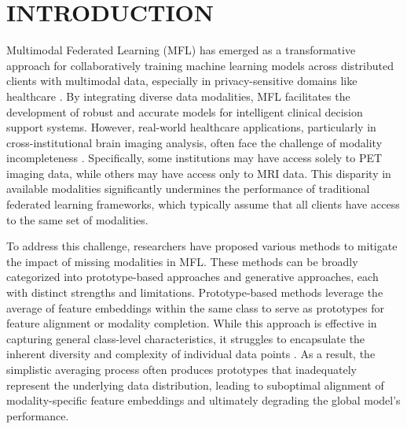 \section{INTRODUCTION}
Multimodal Federated Learning (MFL) has emerged as a transformative approach for collaboratively training machine learning models across distributed clients with multimodal data, especially in privacy-sensitive domains like healthcare \cite{MLF_healthcare_review,MFL_a_survey,survey_of_MFL}. By integrating diverse data modalities, MFL facilitates the development of robust and accurate models for intelligent clinical decision support systems. However, real-world healthcare applications, particularly in cross-institutional brain imaging analysis, often face the challenge of modality incompleteness \cite{FedMI}. Specifically, some institutions  may have access solely to PET imaging data, while others may have access only to MRI data. This disparity in available modalities significantly undermines the performance of traditional federated learning frameworks, which typically assume that all clients have access to the same set of modalities.

To address this challenge, researchers have proposed various methods to mitigate the impact of missing modalities in MFL. These methods can be broadly categorized into prototype-based approaches and generative approaches, each with distinct strengths and limitations. Prototype-based methods \cite{FedMI,MFCPL,PmcmFL} leverage the average of feature embeddings within the same class to serve as prototypes for feature alignment or modality completion. While this approach is effective in capturing general class-level characteristics, it struggles to encapsulate the inherent diversity and complexity of individual data points \cite{prototype_limiation1,prototype_limiation2,prototype_limiation3}. As a result, the simplistic averaging process often produces prototypes that inadequately represent the underlying data distribution, leading to suboptimal alignment of modality-specific feature embeddings and ultimately degrading the global model's performance.

